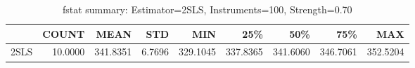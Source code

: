 \begin{table}[ht]
\centering
\caption{fstat summary: Estimator=2SLS, Instruments=100, Strength=0.70}
\begin{tabular}{lrrrrrrrr}
\toprule
 & COUNT & MEAN & STD & MIN & 25\% & 50\% & 75\% & MAX \\
\midrule
2SLS & 10.0000 & 341.8351 & 6.7696 & 329.1045 & 337.8365 & 341.6060 & 346.7061 & 352.5204 \\
\bottomrule
\end{tabular}
\end{table}
